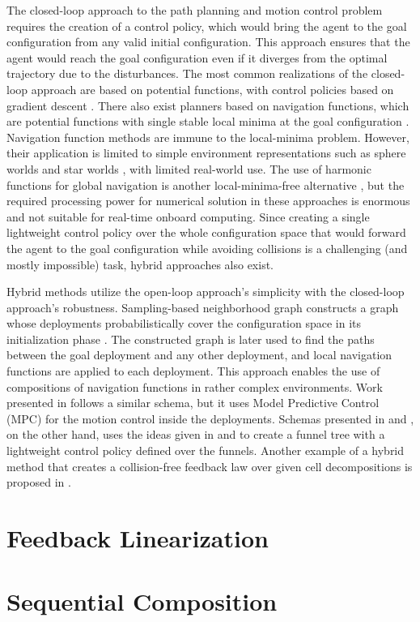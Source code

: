 The closed-loop approach to the path planning and motion control problem requires the creation of a control policy, which would bring the agent to the goal configuration from any valid initial configuration.
This approach ensures that the agent would reach the goal configuration even if it diverges from the optimal trajectory due to the disturbances.
The most common realizations of the closed-loop approach are based on potential functions, with control policies based on gradient descent \cite{Khatib1986}. %
There also exist planners based on navigation functions, which are potential functions with single stable local minima at the goal configuration \cite{KODITSCHEK1990412}.
Navigation function methods are immune to the local-minima problem. However, their application is limited to simple environment representations such as sphere worlds and star worlds \cite{Rimon1992}, with limited real-world use.
The use of harmonic functions for global navigation is another local-minima-free alternative \cite{Connolly1990} \cite{Golan2017}, but the required processing power for numerical solution in these approaches is enormous and not suitable for real-time onboard computing.
Since creating a single lightweight control policy over the whole configuration space that would forward the agent to the goal configuration while avoiding collisions is a challenging (and mostly impossible) task, hybrid approaches also exist.

Hybrid methods utilize the open-loop approach's simplicity with the closed-loop approach's robustness.
Sampling-based neighborhood graph constructs a graph whose deployments probabilistically cover the configuration space in its initialization phase \cite{sng2004}. 
The constructed graph is later used to find the paths between the goal deployment and any other deployment, and local navigation functions are applied to each deployment.
This approach enables the use of compositions of navigation functions in rather complex environments. Work presented in \cite{karagoz2020MpcGraph} follows a similar schema, but it uses Model Predictive Control (MPC) for the motion control inside the deployments.
Schemas presented in \cite{golbol2018RGTrees} and \cite{Ege2019}, on the other hand, uses the ideas given in \cite{Burridge1999SequentialComposition} and \cite{rrt2001} to create a funnel tree with a lightweight control policy defined over the funnels.
Another example of a hybrid method that creates a collision-free feedback law over given cell decompositions is proposed in \cite{Lindemann2009}.

\section{Feedback Linearization}
\label{section:feedback-linearization}
\lipsum

\section{Sequential Composition}
\label{section:sequential-composition}
\lipsum
